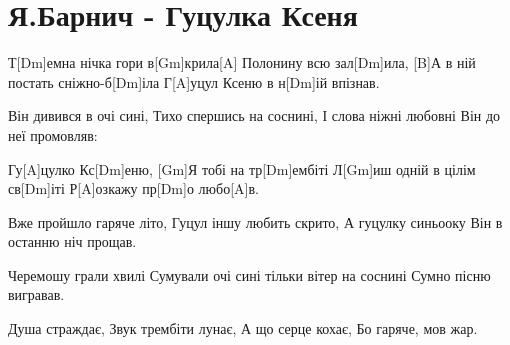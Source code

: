 \section{Я.Барнич - Гуцулка Ксеня}
\begin{guitar}
Т[Dm]емна нічка гори в[Gm]крила[A]\newline
Полонину всю зал[Dm]ила,
[B]А в ній постать сніжно-б[Dm]іла
Г[A]уцул Ксеню в н[Dm]ій впізнав.

Він дивився в очі сині,
Тихо спершись на соснині,
І слова ніжні любовні
Він до неї промовляв:

Гу[A]цулко Кс[Dm]еню,
[Gm]Я тобі на тр[Dm]ембіті
Л[Gm]иш одній в цілім св[Dm]іті
Р[A]озкажу пр[Dm]о любо[A]в.

Вже пройшло гаряче літо,
Гуцул іншу любить скрито,
А гуцулку синьооку
Він в останню ніч прощав.

Черемошу грали хвилі
Сумували очі сині
тільки вітер на соснині
Сумно пісню вигравав.

Душа страждає,
Звук трембіти лунає,
А що серце кохає,
Бо гаряче, мов жар.
\end{guitar}
